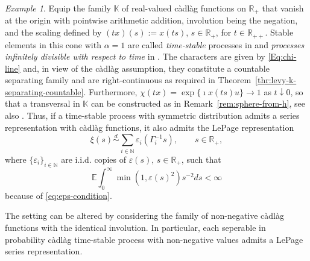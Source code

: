 \documentclass[12pt]{amsart}
\numberwithin{equation}{section}
\numberwithin{figure}{section}
\theoremstyle{plain} \newtheorem{theorem}{Theorem}[section]
\theoremstyle{plain} \newtheorem{proposition}[theorem]{Proposition}
\theoremstyle{plain} \newtheorem{lemma}[theorem]{Lemma}
\theoremstyle{plain} \newtheorem{corollary}[theorem]{Corollary}
\theoremstyle{definition} \newtheorem{definition}[theorem]{Definition}
\theoremstyle{definition} \newtheorem{notation}[theorem]{Notation}
\theoremstyle{remark} \newtheorem{remark}[theorem]{Remark}
\theoremstyle{remark} \newtheorem{example}[theorem]{Example}
\theoremstyle{definition} \newtheorem{assumption}{Assumption}
\newcommand{\bE}{\mathbb{E}}
\newcommand{\bK}{\mathbb{K}}
\newcommand{\bN}{\mathbb{N}}
\newcommand{\bR}{\mathbb{R}}
\renewcommand{\epsilon}{\varepsilon}
\newcommand{\eps}{\epsilon}
\newcommand{\eqd}{\overset{d}{\sim}}
\begin{document}
\begin{example}
  \label{ex:time-stable}
  Equip the family $\bK$ of real-valued c\`adl\`ag functions on
  $\bR_+$ that vanish at the origin with pointwise arithmetic addition, involution
  being the negation, and the scaling defined by  $(tx)(s):=x(ts)$, $s\in\bR_+$, for
  $t\in\bR_{++}$. Stable elements in this cone with $\alpha=1$ are
  called \emph{time-stable} processes in \cite{kop:mol15} and
  {\em processes infinitely divisible with respect to time} in \cite{man05}.
  The characters are given by \eqref{Eq:chi-line} and, in view of the
  c\`adl\`ag assumption, they constitute a countable separating family
  and are right-continuous as required in
  Theorem~\ref{thr:levy-k-separating-countable}. Furthermore,
  $\chi(tx)=\exp\{\imath x(ts)u\}\to 1$ as $t\downarrow0$, so that a
  transversal in $\bK$ can be constructed as in
  Remark~\ref{rem:sphere-from-h}, see also \cite{kop:mol15}. Thus, if
  a time-stable process with symmetric distribution admits a series
  representation with c\`adl\`ag functions, it also admits the LePage
  representation
  \begin{displaymath}
    \xi(s)\eqd \sum_{i\in\bN} \eps_i(\Gamma_i^{-1}s),\qquad s\in\bR_+,
  \end{displaymath}
  where $\{\eps_i\}_{i\in\bN}$ are i.i.d. copies of $\eps(s)$,
  $s\in\bR_+$, such that 
  \begin{displaymath}
    \bE \int_0^\infty \min(1,\eps(s)^2)s^{-2}ds<\infty
  \end{displaymath}
  because of \eqref{eq:eps-condition}. 

  The setting can be altered by considering the family of non-negative
  c\`adl\`ag functions with the identical involution. In particular,
  each seperable in probability c\`adl\`ag time-stable
  process with non-negative values admits a LePage series
  representation.
\end{example}
\end{document}
